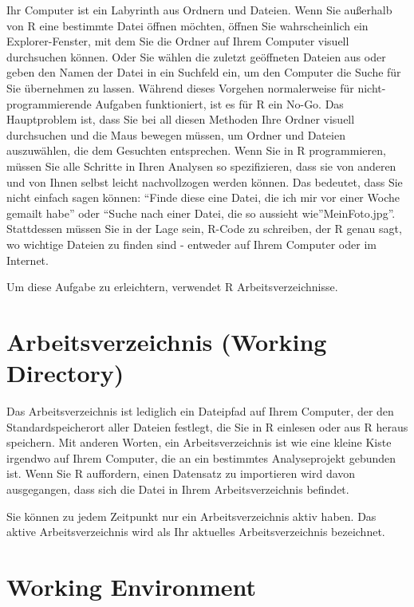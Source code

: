 \documentclass[
]{book}
\begin{document}
Ihr Computer ist ein Labyrinth aus Ordnern und Dateien. Wenn Sie außerhalb von R eine bestimmte Datei öffnen möchten, öffnen Sie wahrscheinlich ein Explorer-Fenster, mit dem Sie die Ordner auf Ihrem Computer visuell durchsuchen können. Oder Sie wählen die zuletzt geöffneten Dateien aus oder geben den Namen der Datei in ein Suchfeld ein, um den Computer die Suche für Sie übernehmen zu lassen. Während dieses Vorgehen normalerweise für nicht-programmierende Aufgaben funktioniert, ist es für R ein No-Go. Das Hauptproblem ist, dass Sie bei all diesen Methoden Ihre Ordner visuell durchsuchen und die Maus bewegen müssen, um Ordner und Dateien auszuwählen, die dem Gesuchten entsprechen. Wenn Sie in R programmieren, müssen Sie alle Schritte in Ihren Analysen so spezifizieren, dass sie von anderen und von Ihnen selbst leicht nachvollzogen werden können. Das bedeutet, dass Sie nicht einfach sagen können: ``Finde diese eine Datei, die ich mir vor einer Woche gemailt habe'' oder ``Suche nach einer Datei, die so aussieht wie''MeinFoto.jpg''. Stattdessen müssen Sie in der Lage sein, R-Code zu schreiben, der R genau sagt, wo wichtige Dateien zu finden sind - entweder auf Ihrem Computer oder im Internet.

Um diese Aufgabe zu erleichtern, verwendet R Arbeitsverzeichnisse.

\section{Arbeitsverzeichnis (Working Directory)}\label{arbeitsverzeichnis-working-directory}

Das Arbeitsverzeichnis ist lediglich ein Dateipfad auf Ihrem Computer, der den Standardspeicherort aller Dateien festlegt, die Sie in R einlesen oder aus R heraus speichern. Mit anderen Worten, ein Arbeitsverzeichnis ist wie eine kleine Kiste irgendwo auf Ihrem Computer, die an ein bestimmtes Analyseprojekt gebunden ist. Wenn Sie R auffordern, einen Datensatz zu importieren wird davon ausgegangen, dass sich die Datei in Ihrem Arbeitsverzeichnis befindet.

Sie können zu jedem Zeitpunkt nur ein Arbeitsverzeichnis aktiv haben. Das aktive Arbeitsverzeichnis wird als Ihr aktuelles Arbeitsverzeichnis bezeichnet.

\section{Working Environment}\label{working-environment}
\end{document}
